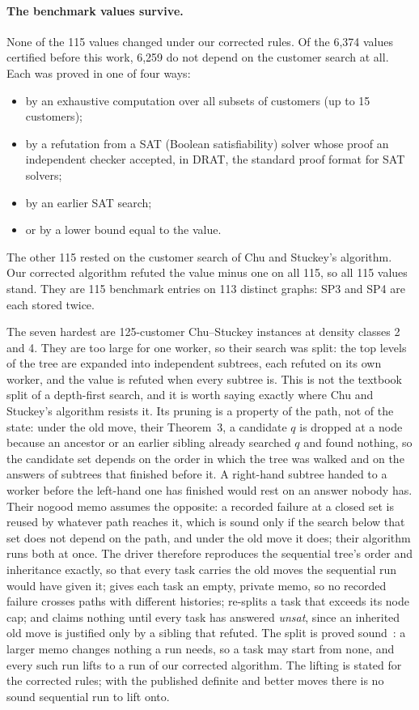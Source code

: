 \paragraph{The benchmark values survive.} None of the 115 values changed under
our corrected rules. Of the 6,374 values certified before this work, 6,259 do
not depend on the customer search at all. Each was proved in one of four ways:
\begin{itemize}
\item by an exhaustive computation over all subsets of customers (up to 15
  customers);
\item by a refutation from a SAT (Boolean satisfiability) solver whose proof an
  independent checker accepted, in DRAT, the standard proof format for SAT
  solvers;
\item by an earlier SAT search;
\item or by a lower bound equal to the value.
\end{itemize}
The other 115 rested on the customer search
of Chu and Stuckey's algorithm. Our corrected algorithm refuted the value minus one on
all 115, so all 115 values stand. They are 115 benchmark entries on 113
distinct graphs: SP3 and SP4 are each stored twice.

The seven hardest are 125-customer Chu--Stuckey instances at density classes 2
and 4. They are too large for one worker, so their search was split:
the top levels of the tree are expanded into independent subtrees, each
refuted on its own worker, and the value is refuted when every subtree is.
This is not the textbook split of a depth-first search, and it is worth
saying exactly where Chu and Stuckey's algorithm resists it. Its pruning is a
property of the path, not of the state: under the old move, their Theorem~3,
a candidate $q$ is dropped at a node because an ancestor or an earlier
sibling already searched $q$ and found nothing, so the candidate set depends
on the order in which the tree was walked and on the answers of subtrees that
finished before it. A right-hand subtree handed to a worker before the
left-hand one has finished would rest on an answer nobody has. Their nogood
memo assumes the opposite: a recorded failure at a closed set is reused by
whatever path reaches it, which is sound only if the search below that set
does not depend on the path, and under the old move it does; their algorithm
runs both at once. The driver therefore reproduces the sequential tree's
order and inheritance exactly, so that every task carries the old moves the
sequential run would have given it; gives each task an empty, private memo,
so no recorded failure crosses paths with different histories; re-splits a
task that exceeds its node cap; and claims nothing until every task has
answered \emph{unsat}, since an inherited old move is justified only by a
sibling that refuted. The split is proved sound~: a larger
memo changes nothing a run needs, so a task may start from none, and every
such run lifts to a run of our corrected algorithm. The lifting is stated for
the corrected rules; with the published definite and better moves there is no
sound sequential run to lift onto.

